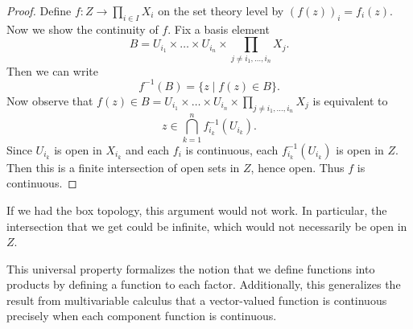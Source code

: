 \begin{proof}
  Define $f : Z \to \prod_{i \in I} X_i$ on the
  set theory level by $(f(z))_i = f_i(z)$. Now we
  show the continuity of $f$. Fix a basis
  element
  \[
    B = U_{i_1} \times \dots \times U_{i_n} \times
    \prod_{j \ne i_1, \dots, i_n} X_j.
  \]
  Then we can write
  \[
    f^{-1}(B) = \{z \mid f(z) \in B\}.
  \]
  Now observe that $f(z) \in B = U_{i_1} \times \dots \times U_{i_n} \times \prod_{j \ne i_1, \dots, i_n} X_j$
  is equivalent to
  \[
    z \in \bigcap_{k = 1}^n f_{i_k}^{-1}(U_{i_k}).
  \]
  Since $U_{i_k}$ is open in $X_{i_k}$ and
  each $f_i$ is continuous, each
  $f_{i_k}^{-1}(U_{i_k})$ is open in $Z$.
  Then this is a finite intersection of open
  sets in $Z$, hence open. Thus $f$ is continuous.
\end{proof}

\begin{remark}
  If we had the box topology, this argument
  would not work. In particular, the intersection
  that we get could be infinite, which would
  not necessarily be open in $Z$.
\end{remark}

\begin{remark}
  This universal property formalizes the notion that
  we define functions into products by defining
  a function to each factor. Additionally, this
  generalizes the result from multivariable calculus
  that a vector-valued function is continuous
  precisely when each component function is continuous.
\end{remark}
